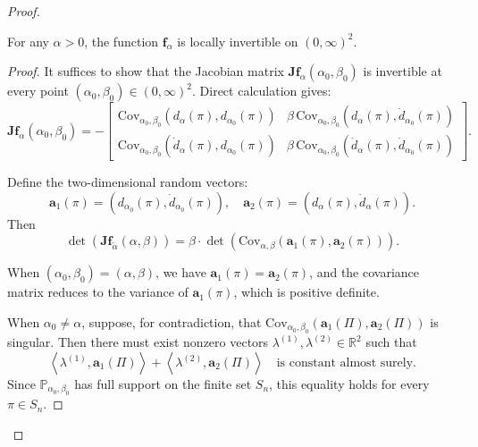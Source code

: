 \documentclass[10pt,a4paper]{amsart}
\renewcommand{\P}{\mathbb{P}}
\begin{document}
\begin{proof}
\begin{lemma}\label{lem:local_invertibility}
For any \(\alpha > 0\), the function \(\boldsymbol{f}_{\alpha}\) is locally invertible on \((0,\infty)^2\).
\end{lemma}

\begin{proof}
It suffices to show that the Jacobian matrix \(\boldsymbol{J}\boldsymbol{f}_{\alpha}(\alpha_0,\beta_0)\) is invertible at every point \((\alpha_0,\beta_0) \in (0,\infty)^2\).
Direct calculation gives:
\[
\boldsymbol{J}\boldsymbol{f}_{\alpha}(\alpha_0,\beta_0)
= -
\begin{bmatrix}
\mathrm{Cov}_{\alpha_0,\beta_0}\left(d_\alpha(\pi), d_{\alpha_0}(\pi)\right) &
\beta \, \mathrm{Cov}_{\alpha_0,\beta_0}\left(d_\alpha(\pi), \dot{d}_{\alpha_0}(\pi)\right)
\\[6pt]
\mathrm{Cov}_{\alpha_0,\beta_0}\left(\dot{d}_\alpha(\pi), d_{\alpha_0}(\pi)\right) &
\beta \, \mathrm{Cov}_{\alpha_0,\beta_0}\left(\dot{d}_\alpha(\pi), \dot{d}_{\alpha_0}(\pi)\right)
\end{bmatrix}.
\]

Define the two-dimensional random vectors:
\[
\boldsymbol{a}_1(\pi) = \left(d_{\alpha_0}(\pi), \dot{d}_{\alpha_0}(\pi)\right),
\quad
\boldsymbol{a}_2(\pi) = \left(d_{\alpha}(\pi), \dot{d}_{\alpha}(\pi)\right).
\]
Then
\[
\det\left( \boldsymbol{J}\boldsymbol{f}_{\tilde\alpha}(\alpha,\beta) \right)
= \beta \cdot \det\left( \mathrm{Cov}_{\alpha,\beta}\left(\boldsymbol{a}_1(\pi), \boldsymbol{a}_2(\pi)\right) \right).
\]

When \((\alpha_0,\beta_0) = (\alpha,\beta)\), we have \(\boldsymbol{a}_1(\pi) = \boldsymbol{a}_2(\pi)\), and the covariance matrix reduces to the variance of \(\boldsymbol{a}_1(\pi)\), which is positive definite.

When \(\alpha_0 \neq \alpha\),  
suppose, for contradiction, that \(\mathrm{Cov}_{\alpha_0,\beta_0}(\boldsymbol{a}_1(\Pi), \boldsymbol{a}_2(\Pi))\) is singular. Then there must exist nonzero vectors \(\lambda^{(1)}, \lambda^{(2)} \in \mathbb{R}^2\) such that
\begin{equation}\label{eq:invertibility_f_jacobian}
\left\langle \lambda^{(1)}, \boldsymbol{a}_1(\Pi) \right\rangle
+
\left\langle \lambda^{(2)}, \boldsymbol{a}_2(\Pi) \right\rangle
\quad \text{is constant almost surely}.
\end{equation}
Since \(\P_{\alpha_0,\beta_0}\) has full support on the finite set \(S_n\), this equality holds for every \(\pi \in S_n\).



\end{proof}
\end{proof}
\end{document}
